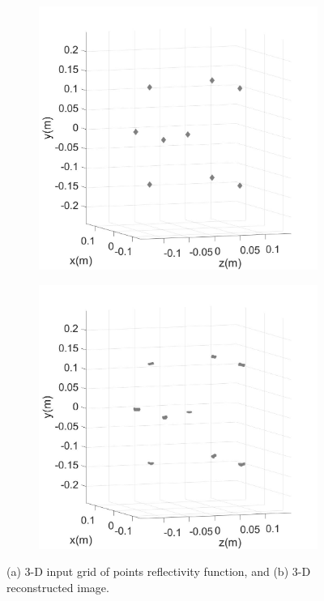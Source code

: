 \documentclass[conference]{IEEEtran}
\begin{document}
		\begin{figure} [h]
			\begin{subfigure}{.5\linewidth}
				\centering
				\includegraphics[width=1\linewidth]{../MatlabResults/CSAR_Grid3D_input}
				\caption{}
				\label{fig:grid3D_in}
			\end{subfigure}%
			\begin{subfigure}{.5\linewidth}
				\label{fig:grid3D_out}
				\centering
				\includegraphics[width=1\linewidth]{../MatlabResults/CSAR_Grid3D_output}
				\caption{}
			\end{subfigure}
			\caption{(a) 3-D input grid of points reflectivity function, and (b) 3-D reconstructed image.}
			\label{fig:simulation_grid}
		\end{figure}
	
\end{document}
